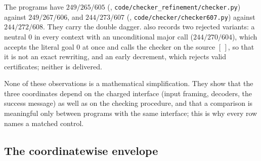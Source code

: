 The programs have $249/265/605$ (,
\texttt{code/checker\_refinement/checker.py}) against $249/267/606$, and
$244/273/607$ (, \texttt{code/checker/checker607.py}) against
$244/272/608$. They carry the double dagger.  also records two
rejected variants: a neutral $0$ in every context with an unconditional major
call ($244/270/604$), which accepts the literal goal $0$ at once and calls the
checker on the source $[\,]$, so that it is not an exact rewriting, and an
early decrement, which rejects valid certificates; neither is delivered.

None of these observations is a mathematical simplification. They show that the
three coordinates depend on the charged interface (input framing, decoders,
the success message) as well as on the checking procedure, and that a
comparison is meaningful only between programs with the same interface; this
is why every row names a matched control.

\subsection{The coordinatewise envelope}\label{cert:sec:envelope}

